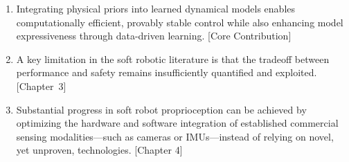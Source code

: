 \documentclass{propositions}
\begin{document}
\begin{enumerate}
    \item %
    Integrating physical priors into learned dynamical models enables computationally efficient, provably stable control while also enhancing model expressiveness through data-driven learning.
    [Core Contribution]
    \item %
    A key limitation in the soft robotic literature is that the tradeoff between performance and safety remains insufficiently quantified and exploited. [Chapter~3]
    \item %
    Substantial progress in soft robot proprioception can be achieved by optimizing the hardware and software integration of established commercial sensing modalities—such as cameras or IMUs—instead of relying on novel, yet unproven, technologies.
    [Chapter 4]

\end{enumerate}
\end{document}
